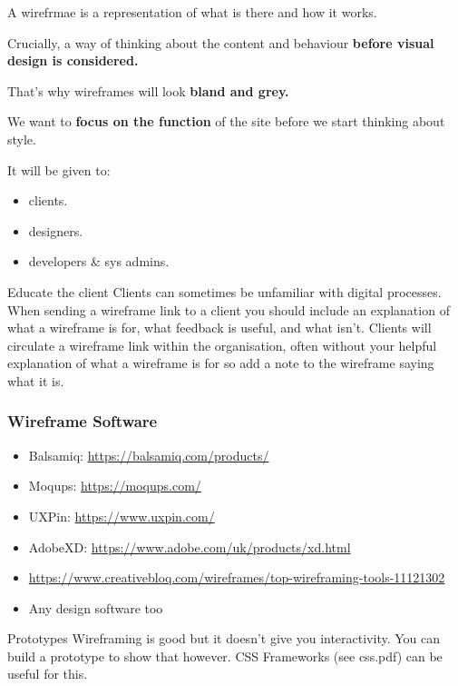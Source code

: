 A wirefrmae is a representation of what is there and how it works.

Crucially, a way of thinking about the content and behaviour \textbf{before visual design is considered.}

That’s why wireframes will look \textbf{bland and grey.}

We want to \textbf{focus on the function} of the site before we start thinking about style.

It will be given to:

\begin{itemize}
    \item clients.
    \item designers.
    \item developers \& sys admins.
\end{itemize}

\begin{infobox}{Educate the client}
    Clients can sometimes be unfamiliar with digital processes. When sending a wireframe link to a client you should include an explanation of what a wireframe is for, what feedback is useful, and what isn’t.
    Clients will circulate a wireframe link within the organisation, often without your helpful explanation of what a wireframe is for so add a note to the wireframe saying what it is.
\end{infobox}

\subsubsection{Wireframe Software}

\begin{itemize}
    \item Balsamiq: \href{https://balsamiq.com/products/}{https://balsamiq.com/products/}
    \item Moqups: \href{https://moqups.com/}{https://moqups.com/}
    \item UXPin: \href{https://www.uxpin.com/}{https://www.uxpin.com/}
    \item AdobeXD: \href{https://www.adobe.com/uk/products/xd.html}{https://www.adobe.com/uk/products/xd.html}
    \item \href{List on Creative Bloc here}{https://www.creativebloq.com/wireframes/top-wireframing-tools-11121302}
    \item Any design software too
\end{itemize}

\begin{infobox}{Prototypes}
    Wireframing is good but it doesn't give you interactivity. You can build a prototype to show that however. CSS Frameworks (see css.pdf) can be useful for this.
\end{infobox}

